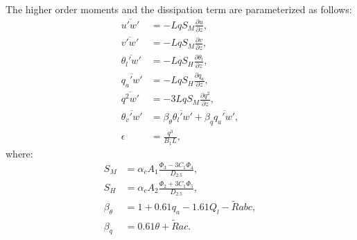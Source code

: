The higher order moments and the dissipation term are parameterized as follows:
\begin{align}
  \overline{u'w'} &= -LqS_M\frac{\partial u}{\partial z}, \\
  \overline{v'w'} &= -LqS_M\frac{\partial v}{\partial z}, \\
  \overline{\theta_l'w'} &= -LqS_H\frac{\partial \theta_l}{\partial z}, \\
  \overline{q_a'w'} &= -LqS_H\frac{\partial q_a}{\partial z}, \\
  \overline{q^2w'} &= -3LqS_M\frac{\partial q^2}{\partial z}, \\
  \overline{\theta_v' w'} &= \beta_\theta\overline{\theta_l'w}'+\beta_q\overline{q_a'w'}, \\
  \epsilon &= \frac{q^3}{B_1L},
\end{align}
where:
\begin{align}
  S_M &= \alpha_cA_1\frac{\Phi_3-3C_1\Phi_4}{D_{2.5}}, \\
  S_H &= \alpha_cA_2\frac{\Phi_2+3C_1\Phi_5}{D_{2.5}}, \\
  \beta_\theta &= 1 + 0.61 q_a - 1.61 Q_l - \tilde{R} abc, \\
  \beta_q &= 0.61\theta + \tilde{R} ac.
\end{align}

